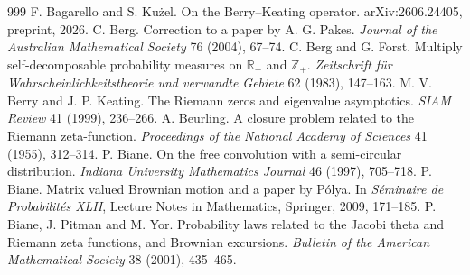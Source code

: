 \begin{thebibliography}{999}
 F. Bagarello and S. Ku\.{z}el. On the Berry--Keating operator. arXiv:2606.24405, preprint, 2026.
 C. Berg. Correction to a paper by A. G. Pakes. \emph{Journal of the Australian Mathematical Society} 76 (2004), 67--74.
 C. Berg and G. Forst. Multiply self-decomposable probability measures on $\mathbb R_+$ and $\mathbb Z_+$. \emph{Zeitschrift f\"ur Wahrscheinlichkeitstheorie und verwandte Gebiete} 62 (1983), 147--163.
 M. V. Berry and J. P. Keating. The Riemann zeros and eigenvalue asymptotics. \emph{SIAM Review} 41 (1999), 236--266.
 A. Beurling. A closure problem related to the Riemann zeta-function. \emph{Proceedings of the National Academy of Sciences} 41 (1955), 312--314.
 P. Biane. On the free convolution with a semi-circular distribution. \emph{Indiana University Mathematics Journal} 46 (1997), 705--718.
 P. Biane. Matrix valued Brownian motion and a paper by P\'olya. In \emph{S\'eminaire de Probabilit\'es XLII}, Lecture Notes in Mathematics, Springer, 2009, 171--185.
 P. Biane, J. Pitman and M. Yor. Probability laws related to the Jacobi theta and Riemann zeta functions, and Brownian excursions. \emph{Bulletin of the American Mathematical Society} 38 (2001), 435--465.

\end{thebibliography}
